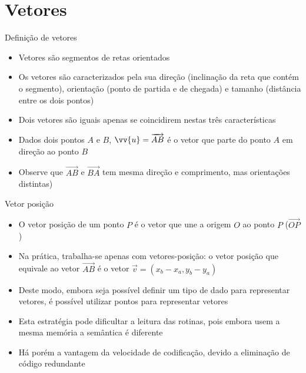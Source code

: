 \section{Vetores}

\begin{frame}[fragile]{Definição de vetores}

    \begin{itemize}
        \item Vetores são segmentos de retas orientados

        \item Os vetores são caracterizados pela sua direção (inclinação da reta que contém o
            segmento), orientação (ponto de partida e de chegada) e tamanho (distância entre os
            dois pontos)

        \item Dois vetores são iguais apenas se coincidirem nestas três características

        \item Dados dois pontos $A$ e $B$, $\vv{u} = \overrightarrow{AB}$ é o vetor que parte do ponto $A$ em direção 
        ao ponto $B$ 

        \item Observe que $\overrightarrow{AB}$ e $\overrightarrow{BA}$ tem mesma direção e comprimento, mas orientações distintas)

    \end{itemize}

\end{frame}

\begin{frame}[fragile]{Vetor posição}

    \begin{itemize}
        \item O vetor posição de um ponto $P$ é o vetor que une a origem $O$ ao ponto $P$ 
            ($\overrightarrow{OP}$)

        \item Na prática, trabalha-se apenas com vetores-posição: o vetor posição que equivale ao
            vetor $\overrightarrow{AB}$ é o vetor $\vec{v} = (x_b - x_a, y_b - y_a)$

        \item Deste modo, embora seja possível definir um tipo de dado para representar vetores, é possível utilizar pontos para representar vetores

        \item Esta estratégia pode dificultar a leitura das rotinas, pois embora usem a mesma memória a semântica é diferente 

        \item Há porém a vantagem da velocidade de codificação, devido a eliminação de código redundante
    \end{itemize}

\end{frame}

